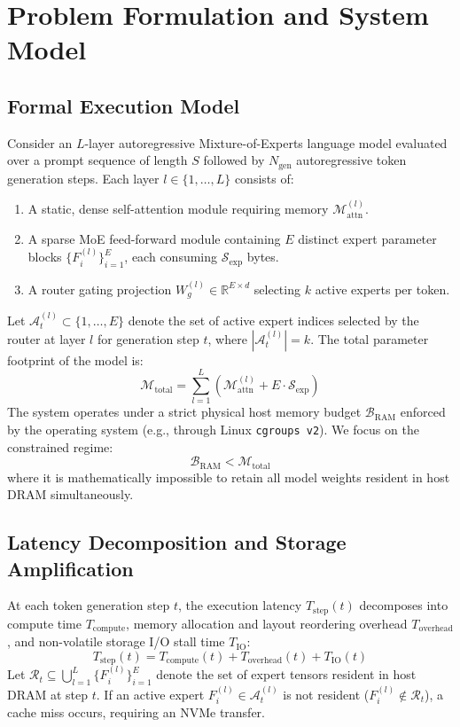 \section{Problem Formulation and System Model}
\label{sec:formulation}

\subsection{Formal Execution Model}
Consider an $L$-layer autoregressive Mixture-of-Experts language model evaluated over a prompt sequence of length $S$ followed by $N_{\text{gen}}$ autoregressive token generation steps.
Each layer $l \in \{1, \dots, L\}$ consists of:
\begin{enumerate}
    \item A static, dense self-attention module requiring memory $\mathcal{M}_{\text{attn}}^{(l)}$.
    \item A sparse MoE feed-forward module containing $E$ distinct expert parameter blocks $\{F_i^{(l)}\}_{i=1}^E$, each consuming $\mathcal{S}_{\text{exp}}$ bytes.
    \item A router gating projection $W_g^{(l)} \in \mathbb{R}^{E \times d}$ selecting $k$ active experts per token.
\end{enumerate}

Let $\mathcal{A}_t^{(l)} \subset \{1, \dots, E\}$ denote the set of active expert indices selected by the router at layer $l$ for generation step $t$, where $|\mathcal{A}_t^{(l)}| = k$.
The total parameter footprint of the model is:
\begin{equation}
    \mathcal{M}_{\text{total}} = \sum_{l=1}^L \left( \mathcal{M}_{\text{attn}}^{(l)} + E \cdot \mathcal{S}_{\text{exp}} \right)
\end{equation}
The system operates under a strict physical host memory budget $\mathcal{B}_{\text{RAM}}$ enforced by the operating system (e.g., through Linux \texttt{cgroups v2}). We focus on the constrained regime:
\begin{equation}
    \mathcal{B}_{\text{RAM}} < \mathcal{M}_{\text{total}}
\end{equation}
where it is mathematically impossible to retain all model weights resident in host DRAM simultaneously.

\subsection{Latency Decomposition and Storage Amplification}
At each token generation step $t$, the execution latency $T_{\text{step}}(t)$ decomposes into compute time $T_{\text{compute}}$, memory allocation and layout reordering overhead $T_{\text{overhead}}$, and non-volatile storage I/O stall time $T_{\text{IO}}$:
\begin{equation}
    T_{\text{step}}(t) = T_{\text{compute}}(t) + T_{\text{overhead}}(t) + T_{\text{IO}}(t)
\end{equation}
Let $\mathcal{R}_t \subseteq \bigcup_{l=1}^L \{F_i^{(l)}\}_{i=1}^E$ denote the set of expert tensors resident in host DRAM at step $t$. If an active expert $F_i^{(l)} \in \mathcal{A}_t^{(l)}$ is not resident ($F_i^{(l)} \notin \mathcal{R}_t$), a cache miss occurs, requiring an NVMe transfer.

